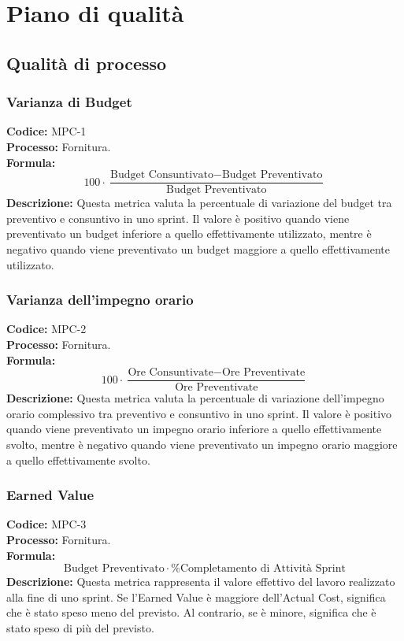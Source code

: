
\section{Piano di qualità}
\label{sec:Piano di qualità}

\subsection{Qualità di processo}
\label{sec:Qualità di processo}

\subsubsection{Varianza di Budget}
\textbf{Codice:} MPC-1 \\
\textbf{Processo:} Fornitura. \\
\textbf{Formula:}
\[
100 \cdot \frac{\text{Budget Consuntivato} - \text{Budget Preventivato}}{\text{Budget Preventivato}}
\]
\textbf{Descrizione:} Questa metrica valuta la percentuale di variazione del budget tra preventivo e consuntivo in uno sprint. Il valore è positivo quando viene preventivato un budget inferiore a quello effettivamente utilizzato, mentre è negativo quando viene preventivato un budget maggiore a quello effettivamente utilizzato.

\subsubsection{Varianza dell’impegno orario}
\textbf{Codice:} MPC-2 \\
\textbf{Processo:} Fornitura. \\
\textbf{Formula:}
\[
100 \cdot \frac{\text{Ore Consuntivate} - \text{Ore Preventivate}}{\text{Ore Preventivate}}
\]
\textbf{Descrizione:} Questa metrica valuta la percentuale di variazione dell’impegno orario complessivo tra preventivo e consuntivo in uno sprint. Il valore è positivo quando viene preventivato un impegno orario inferiore a quello effettivamente svolto, mentre è negativo quando viene preventivato un impegno orario maggiore a quello effettivamente svolto.

\subsubsection{Earned Value}
\textbf{Codice:} MPC-3 \\
\textbf{Processo:} Fornitura. \\
\textbf{Formula:}
\[
\text{Budget Preventivato} \cdot \% \text{Completamento di Attività Sprint}
\]
\textbf{Descrizione:} Questa metrica rappresenta il valore effettivo del lavoro realizzato alla fine di uno sprint. Se l’Earned Value è maggiore dell’Actual Cost, significa che è stato speso meno del previsto. Al contrario, se è minore, significa che è stato speso di più del previsto.

